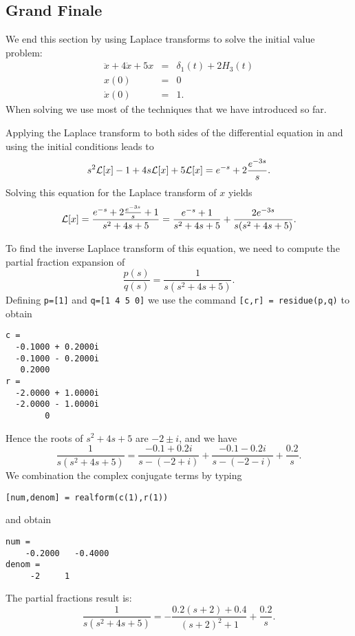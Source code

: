 \subsection*{Grand Finale}

We end this section by using Laplace transforms to solve the initial 
value problem:
\begin{equation}  \label{eq:lapendexam}
\begin{array}{rcl}
\ddot x + 4\dot x +5x  & = & \delta_1(t)+2H_3(t) \\
x(0) & = & 0 \\
\dot x(0) & = & 1.
\end{array}
\end{equation}
When solving  we use most of the techniques that we have 
introduced so far.  

Applying the Laplace transform to both sides of the differential
equation in  and using the initial conditions leads to
\[
s^2{\cal L}[x] -1 + 4s{\cal L}[x] + 5{\cal L}[x]=
e^{-s} +2\frac{e^{-3s}}{s}.
\]
Solving this equation for the Laplace transform of $x$ yields
\[
{\cal L}[x] = \frac{e^{-s} +2\frac{e^{-3s}}{s}+1}{s^2+4s+5}
= \frac{e^{-s}+1}{s^2+4s+5}+ \frac{2e^{-3s}}{s(s^2+4s+5)}.
\]

To find the inverse Laplace transform
of this equation, we need to 
compute the partial fraction expansion of 
\[
\frac{p(s)}{q(s)} = \frac{1}{s(s^2+4s+5)}.
\]
Defining {\tt p=[1]} and {\tt q=[1 4 5 0]} we use the 
command {\tt [c,r] = residue(p,q)} to obtain 
\begin{verbatim}
c =
  -0.1000 + 0.2000i
  -0.1000 - 0.2000i
   0.2000          
r =
  -2.0000 + 1.0000i
  -2.0000 - 1.0000i
        0          
\end{verbatim}

Hence the roots of $s^2+4s+5$ are $-2\pm i$, and we have
\[
\frac{1}{s(s^2+4s+5)} = \frac{-0.1 + 0.2i}{s-(-2+i)}+
\frac{-0.1-0.2i}{s-(-2-i)}+\frac{0.2}{s}.
\]
We combination the complex conjugate terms by typing
\begin{verbatim}
[num,denom] = realform(c(1),r(1))
\end{verbatim}
and obtain
\begin{verbatim}
num =
    -0.2000   -0.4000
denom =
     -2     1
\end{verbatim}
The partial fractions result is:
\[
\frac{1}{s(s^2+4s+5)} = -\frac{0.2(s+2)+0.4}{(s+2)^2+1}
+\frac{0.2}{s}.
\]

